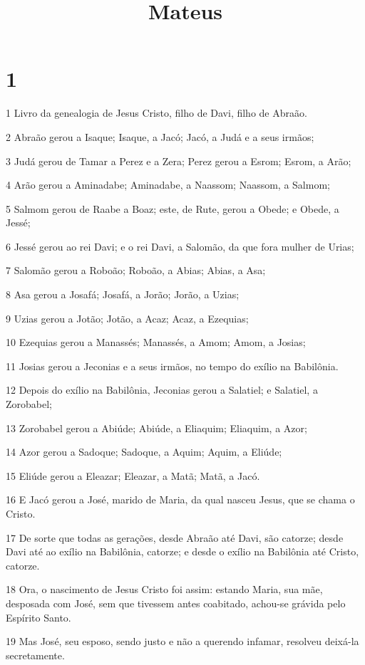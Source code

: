 

\title{Mateus}


\chapter{1}

\par 1 Livro da genealogia de Jesus Cristo, filho de Davi, filho de Abraão.
\par 2 Abraão gerou a Isaque; Isaque, a Jacó; Jacó, a Judá e a seus irmãos;
\par 3 Judá gerou de Tamar a Perez e a Zera; Perez gerou a Esrom; Esrom, a Arão;
\par 4 Arão gerou a Aminadabe; Aminadabe, a Naassom; Naassom, a Salmom;
\par 5 Salmom gerou de Raabe a Boaz; este, de Rute, gerou a Obede; e Obede, a Jessé;
\par 6 Jessé gerou ao rei Davi; e o rei Davi, a Salomão, da que fora mulher de Urias;
\par 7 Salomão gerou a Roboão; Roboão, a Abias; Abias, a Asa;
\par 8 Asa gerou a Josafá; Josafá, a Jorão; Jorão, a Uzias;
\par 9 Uzias gerou a Jotão; Jotão, a Acaz; Acaz, a Ezequias;
\par 10 Ezequias gerou a Manassés; Manassés, a Amom; Amom, a Josias;
\par 11 Josias gerou a Jeconias e a seus irmãos, no tempo do exílio na Babilônia.
\par 12 Depois do exílio na Babilônia, Jeconias gerou a Salatiel; e Salatiel, a Zorobabel;
\par 13 Zorobabel gerou a Abiúde; Abiúde, a Eliaquim; Eliaquim, a Azor;
\par 14 Azor gerou a Sadoque; Sadoque, a Aquim; Aquim, a Eliúde;
\par 15 Eliúde gerou a Eleazar; Eleazar, a Matã; Matã, a Jacó.
\par 16 E Jacó gerou a José, marido de Maria, da qual nasceu Jesus, que se chama o Cristo.
\par 17 De sorte que todas as gerações, desde Abraão até Davi, são catorze; desde Davi até ao exílio na Babilônia, catorze; e desde o exílio na Babilônia até Cristo, catorze.
\par 18 Ora, o nascimento de Jesus Cristo foi assim: estando Maria, sua mãe, desposada com José, sem que tivessem antes coabitado, achou-se grávida pelo Espírito Santo.
\par 19 Mas José, seu esposo, sendo justo e não a querendo infamar, resolveu deixá-la secretamente.
